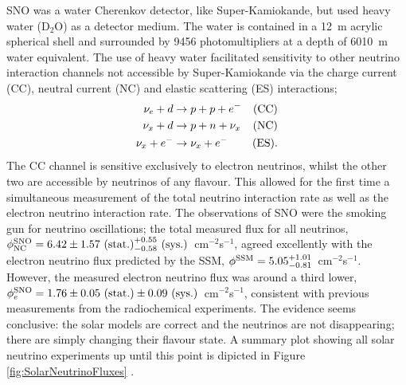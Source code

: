 SNO was a water Cherenkov detector, like Super-Kamiokande, but used heavy water (D$_2$O) as a detector medium.  The water is contained in a 12~m acrylic spherical shell and surrounded by 9456 photomultipliers at a depth of 6010~m water equivalent.  The use of heavy water facilitated sensitivity to other neutrino interaction channels not accessible by Super-Kamiokande via the charge current (CC), neutral current (NC) and elastic scattering (ES) interactions;
\begin{align}
  \nu_e + d &\rightarrow p + p + e^- &\textnormal{(CC)} \\
  \nu_x + d &\rightarrow p + n + \nu_x &\textnormal{(NC)} \\
  \nu_x + e^- &\rightarrow \nu_x + e^- &\textnormal{(ES)}.
\end{align}
The CC channel is sensitive exclusively to electron neutrinos, whilst the other two are accessible by neutrinos of any flavour.  This allowed for the first time a simultaneous measurement of the total neutrino interaction rate as well as the electron neutrino interaction rate.  The observations of SNO were the smoking gun for neutrino oscillations; the total measured flux for all neutrinos, $\phi_{\textnormal{NC}}^{\textnormal{SNO}} = 6.42\pm1.57\textnormal{~(stat.)}^{+0.55}_{-0.58}\textnormal{~(sys.)}$~cm$^{-2}$s$^{-1}$, agreed excellently with the electron neutrino flux predicted by the SSM, $\phi^{\textnormal{SSM}} = 5.05^{+1.01}_{-0.81}$~cm$^{-2}$s$^{-1}$.  However, the measured electron neutrino flux was around a third lower, $\phi_e^{\textnormal{SNO}} = 1.76\pm0.05\textnormal{~(stat.)}\pm0.09\textnormal{~(sys.)}$~cm$^{-2}$s$^{-1}$, consistent with previous measurements from the radiochemical experiments.  The evidence seems conclusive: the solar models are correct and the neutrinos are not disappearing; there are simply changing their flavour state.  A summary plot showing all solar neutrino experiments up until this point is dipicted in Figure \ref{fig:SolarNeutrinoFluxes} \cite{Bahcall2005Fluxes}.

